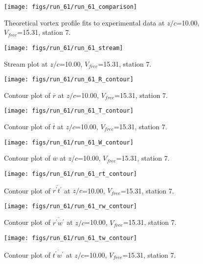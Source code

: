 \begin{figure}[H]
\centering
\texttt{[image: figs/run\_61/run\_61\_comparison]}
\caption{Theoretical vortex profile fits to experimental data at $z/c$=10.00, $V_{free}$=15.31, station 7.}
\label{fig:run_61_comparison}
\end{figure}


\begin{figure}[H]
\centering
\texttt{[image: figs/run\_61/run\_61\_stream]}
\caption{Stream plot at $z/c$=10.00, $V_{free}$=15.31, station 7.}
\label{fig:run_61_stream}
\end{figure}


\begin{figure}[H]
\centering
\texttt{[image: figs/run\_61/run\_61\_R\_contour]}
\caption{Contour plot of $\overline{r}$ at $z/c$=10.00, $V_{free}$=15.31, station 7.}
\label{fig:run_61_R_contour}
\end{figure}


\begin{figure}[H]
\centering
\texttt{[image: figs/run\_61/run\_61\_T\_contour]}
\caption{Contour plot of $\overline{t}$ at $z/c$=10.00, $V_{free}$=15.31, station 7.}
\label{fig:run_61_T_contour}
\end{figure}


\begin{figure}[H]
\centering
\texttt{[image: figs/run\_61/run\_61\_W\_contour]}
\caption{Contour plot of $\overline{w}$ at $z/c$=10.00, $V_{free}$=15.31, station 7.}
\label{fig:run_61_W_contour}
\end{figure}


\begin{figure}[H]
\centering
\texttt{[image: figs/run\_61/run\_61\_rt\_contour]}
\caption{Contour plot of $\overline{r^\prime t^\prime}$ at $z/c$=10.00, $V_{free}$=15.31, station 7.}
\label{fig:run_61_rt_contour}
\end{figure}


\begin{figure}[H]
\centering
\texttt{[image: figs/run\_61/run\_61\_rw\_contour]}
\caption{Contour plot of $\overline{r^\prime w^\prime}$ at $z/c$=10.00, $V_{free}$=15.31, station 7.}
\label{fig:run_61_rw_contour}
\end{figure}


\begin{figure}[H]
\centering
\texttt{[image: figs/run\_61/run\_61\_tw\_contour]}
\caption{Contour plot of $\overline{t^\prime w^\prime}$ at $z/c$=10.00, $V_{free}$=15.31, station 7.}
\label{fig:run_61_tw_contour}
\end{figure}


